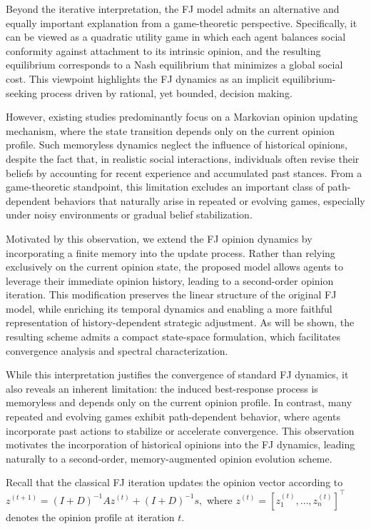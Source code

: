 \documentclass[sigconf,review, nonacm]{acmart}
\newcommand\s{\boldsymbol{\mathit{s}}}
\newcommand\zz{\boldsymbol{\mathit{z}}}
\renewcommand\AA{\boldsymbol{\mathit{A}}}
\newcommand\DD{\boldsymbol{\mathit{D}}}
\newcommand\II{\boldsymbol{\mathit{I}}}
\begin{document}
Beyond the iterative interpretation, the FJ model admits an alternative and equally important explanation from a game-theoretic perspective.
Specifically, it can be viewed as a quadratic utility game in which each agent balances social conformity against attachment to its intrinsic opinion, and the
resulting equilibrium corresponds to a Nash equilibrium that minimizes a global social cost.
This viewpoint highlights the FJ dynamics as an implicit equilibrium-seeking process driven by rational, yet bounded, decision making.

However, existing studies predominantly focus on a Markovian opinion updating mechanism, where the state transition depends only on the current opinion profile.
Such memoryless dynamics neglect the influence of historical opinions, despite the fact that, in realistic social interactions, individuals often revise their beliefs by accounting for recent experience and accumulated past stances.
From a game-theoretic standpoint, this limitation excludes an important class of path-dependent behaviors that naturally arise in repeated or evolving games,
especially under noisy environments or gradual belief stabilization.

Motivated by this observation, we extend the FJ opinion dynamics by incorporating a finite memory into the update process.
Rather than relying exclusively on the current opinion state, the proposed model allows agents to leverage their immediate opinion history, leading to a
second-order opinion iteration.
This modification preserves the linear structure of the original FJ model, while enriching its temporal dynamics and enabling a more faithful representation of
history-dependent strategic adjustment.
As will be shown, the resulting scheme admits a compact state-space formulation, which facilitates convergence analysis and spectral characterization.


While this interpretation justifies the convergence of standard FJ dynamics,
it also reveals an inherent limitation: the induced best-response process is
memoryless and depends only on the current opinion profile.
In contrast, many repeated and evolving games exhibit path-dependent behavior,
where agents incorporate past actions to stabilize or accelerate convergence.
This observation motivates the incorporation of historical opinions into the
FJ dynamics, leading naturally to a second-order, memory-augmented opinion
evolution scheme.



Recall that the classical FJ iteration updates the opinion vector according to
$
\zz^{(t+1)} = (\II+\DD)^{-1}\AA \zz^{(t)} + (\II+\DD)^{-1}\s,$
where $\zz^{(t)} = [z_1^{(t)}, \ldots, z_n^{(t)}]^\top$ denotes the opinion profile at iteration $t$.
\end{document}
